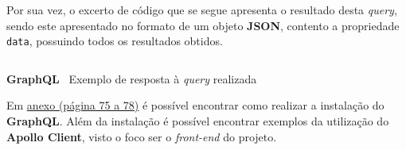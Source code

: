 Por sua vez, o excerto de código que se segue apresenta o resultado desta \textit{query}, sendo este apresentado no formato de um objeto \textbf{JSON}, contento a propriedade \texttt{data}, possuindo todos os resultados obtidos.

\begin{longlisting}
	\inputminted{json}{code/graphql/example-result.json}
	\caption{\textbf{GraphQL} \textemdash~Exemplo de resposta à \textit{query} realizada}
\end{longlisting}

Em \underline{\hyperref[graphqlAttachments]{anexo {\footnotesize(página  75 a 78)}}} é possível encontrar como realizar a instalação do \textbf{GraphQL}. Além da instalação é possível encontrar exemplos da utilização do \textbf{Apollo Client}, visto o foco ser o \textit{front-end} do projeto.